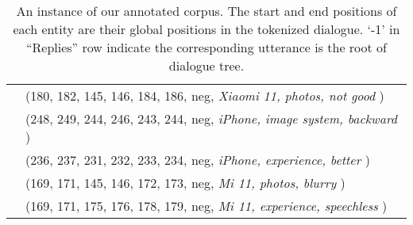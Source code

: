 \documentclass[11pt]{article}
\begin{document}
\begin{table*}[!ht]
\begin{tabular}{l l p{7cm} p{6cm}}
   &  \multicolumn{3}{l}{(180, 182, 145, 146, 184, 186, neg, \textit{Xiaomi 11, photos, not good })} \\
   &  \multicolumn{3}{l}{(248, 249, 244, 246, 243, 244, neg, \textit{iPhone, image system, backward })} \\
   &  \multicolumn{3}{l}{(236, 237, 231, 232, 233, 234, neg, \textit{iPhone, experience, better })} \\
   &  \multicolumn{3}{l}{(169, 171, 145, 146, 172, 173, neg, \textit{Mi 11, photos, blurry })} \\
   &  \multicolumn{3}{l}{(169, 171, 175, 176, 178, 179, neg, \textit{Mi 11, experience, speechless })} \\
  \hline  
  \end{tabular}
  \caption{
  An instance of our annotated corpus.
  The start and end positions of each entity are their global positions in the tokenized dialogue.
  `-1' in ``Replies” row indicate the corresponding utterance is the root of dialogue tree.
  }
  \label{table:data-instance}
  \end{table*}
\end{document}
